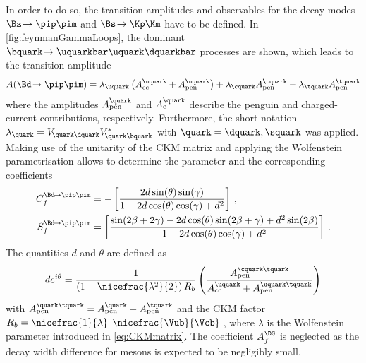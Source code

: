 In order to do so, the transition amplitudes and \CP observables for the decay modes $\Bz\!\to\pip\pim$ and $\Bs\!\to\Kp\Km$ have to be defined.
In \cref{fig:feynmanGammaLoops}, the dominant $\bquark\!\to\uquarkbar\uquark\dquarkbar$ processes are shown, which leads to the transition amplitude
\begin{equation}
A\!\left(\Bd\!\to\pip\pim\right)=\lambda_\uquark\left(A_{\text{cc}}^\uquark+A_{\text{pen}}^\uquark\right)+\lambda_\cquark A_{\text{pen}}^\cquark+\lambda_\tquark A_{\text{pen}}^\tquark
\end{equation}
where the amplitudes $A_{\text{pen}}^\quark$ and $A_{\text{c}}^\quark$ describe the penguin and charged-current contributions, respectively.
Furthermore, the short notation $\lambda_\quark=V_{{\kern -0.1em}\quark\dquark}V^{*}_{{\kern -0.1em}\quark\bquark}$ with $\quark=\dquark,\squark$ was applied.
Making use of the unitarity of the CKM matrix and applying the Wolfenstein parametrisation \cite{Wolfenstein:1983yz} allows to determine the parameter \Lf and the corresponding \CP coefficients
\begin{equation}
\begin{aligned}
C_{f}^{\Bd\!\to\pip\pim}&=-\left[\frac{2d\sin\!\left(\theta\right)\sin\!\left(\gamma\right)}{1-2d\cos\!\left(\theta\right)\cos\!\left(\gamma\right)+d^2}\right]\,,\\
S_{f}^{\Bd\!\to\pip\pim}&=\left[\frac{\sin\!\left(2\beta+2\gamma\right)-2d\cos\!\left(\theta\right)\sin\!\left(2\beta+\gamma\right)+d^2\sin\!\left(2\beta\right)}{1-2d\cos\!\left(\theta\right)\cos\!\left(\gamma\right)+d^2}\right]\,.
\end{aligned}
\end{equation}
The quantities $d$ and $\theta$ are defined as
\begin{equation}
de^{i\theta}=\frac{1}{\left(1-\nicefrac{\lambda^2}{2}\right)R_b}\left(\frac{A_{\text{pen}}^{\cquark\tquark}}{A_{\text{cc}}^{\uquark}+A_{\text{pen}}^{\uquark\tquark}}\right)
\end{equation}
with $A_{\text{pen}}^{\quark\tquark}=A_{\text{pen}}^{\quark}-A_{\text{pen}}^{\tquark}$ and the CKM factor $R_b=\nicefrac{1}{\lambda}\left|\nicefrac{\Vub}{\Vcb}\right|$, where $\lambda$ is the Wolfenstein parameter introduced in \cref{eq:CKMmatrix}.
The \CP coefficient $A_f^{\DG}$ is neglected as the decay width difference for \Bd mesons is expected to be negligibly small.

